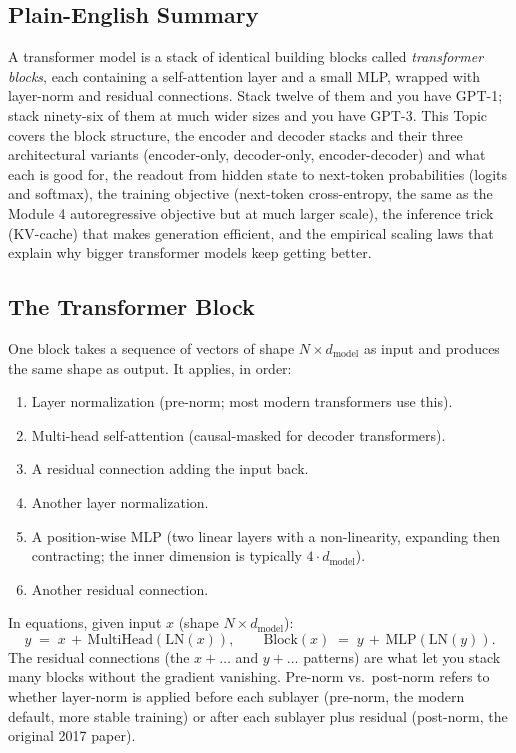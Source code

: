 \documentclass[11pt]{article}
\theoremstyle{remark}
\begin{document}
\subsection{Plain-English Summary}

A transformer model is a stack of identical building blocks called \emph{transformer blocks}, each containing a self-attention layer and a small MLP, wrapped with layer-norm and residual connections. Stack twelve of them and you have GPT-1; stack ninety-six of them at much wider sizes and you have GPT-3. This Topic covers the block structure, the encoder and decoder stacks and their three architectural variants (encoder-only, decoder-only, encoder-decoder) and what each is good for, the readout from hidden state to next-token probabilities (logits and softmax), the training objective (next-token cross-entropy, the same as the Module 4 autoregressive objective but at much larger scale), the inference trick (KV-cache) that makes generation efficient, and the empirical scaling laws that explain why bigger transformer models keep getting better.

\subsection{The Transformer Block}

One block takes a sequence of vectors of shape \(N \times d_{\text{model}}\) as input and produces the same shape as output. It applies, in order:
\begin{enumerate}[noitemsep]
    \item Layer normalization (pre-norm; most modern transformers use this).
    \item Multi-head self-attention (causal-masked for decoder transformers).
    \item A residual connection adding the input back.
    \item Another layer normalization.
    \item A position-wise MLP (two linear layers with a non-linearity, expanding then contracting; the inner dimension is typically \(4 \cdot d_{\text{model}}\)).
    \item Another residual connection.
\end{enumerate}
In equations, given input \(x\) (shape \(N \times d_{\text{model}}\)):
\[
y \;=\; x \,+\, \mathrm{MultiHead}\!\left(\mathrm{LN}(x)\right), \qquad \mathrm{Block}(x) \;=\; y \,+\, \mathrm{MLP}\!\left(\mathrm{LN}(y)\right).
\]
The residual connections (the \(x + \dots\) and \(y + \dots\) patterns) are what let you stack many blocks without the gradient vanishing. Pre-norm vs.\ post-norm refers to whether layer-norm is applied before each sublayer (pre-norm, the modern default, more stable training) or after each sublayer plus residual (post-norm, the original 2017 paper).
\end{document}

